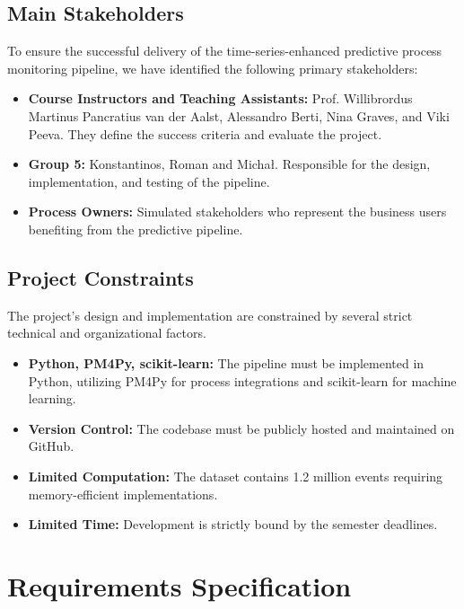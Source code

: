 \documentclass[runningheads]{llncs}
\begin{document}
\subsection{Main Stakeholders}
To ensure the successful delivery of the time-series-enhanced predictive process monitoring pipeline, we have identified the following primary stakeholders:
\begin{itemize}
    \item \textbf{Course Instructors and Teaching Assistants:} Prof. Willibrordus Martinus Pancratius van der Aalst, Alessandro Berti, Nina Graves, and Viki Peeva. They define the success criteria and evaluate the project.
    \item \textbf{Group 5:} Konstantinos, Roman and Michał. Responsible for the design, implementation, and testing of the pipeline.
    \item \textbf{Process Owners:} Simulated stakeholders who represent the business users benefiting from the predictive pipeline.
\end{itemize}

\subsection{Project Constraints}
The project’s design and implementation are constrained by several strict technical and organizational factors.
\begin{itemize}
    \item \textbf{Python, PM4Py, scikit-learn:} The pipeline must be implemented in Python, utilizing PM4Py for process integrations and scikit-learn for machine learning.
    \item \textbf{Version Control:} The codebase must be publicly hosted and maintained on GitHub.
    \item \textbf{Limited Computation:} The dataset \cite{bpic2017} contains 1.2 million events requiring memory-efficient implementations.
    \item \textbf{Limited Time:} Development is strictly bound by the semester deadlines.
\end{itemize}

\section{Requirements Specification}
\end{document}
